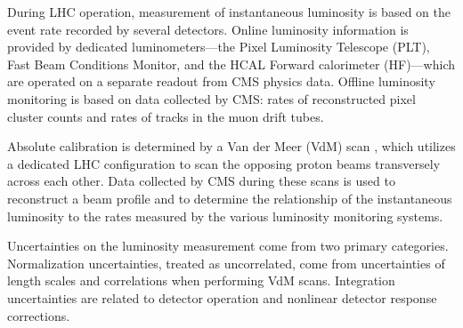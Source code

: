During LHC operation, measurement of  instantaneous luminosity is based on the event rate recorded by several detectors. Online luminosity information is provided by dedicated luminometers---the Pixel Luminosity Telescope (PLT), Fast Beam Conditions Monitor, and the HCAL Forward calorimeter (HF)---which are operated on a separate readout from CMS physics data. Offline luminosity monitoring is based on data collected by CMS: rates of reconstructed pixel cluster counts and rates of tracks in the muon drift tubes\cite{Lujan:2647819}.

Absolute calibration is determined by a Van der Meer (VdM) scan \cite{vanderMeer:1968zz}\cite{Balagura:2011yw}, which utilizes a dedicated LHC configuration to scan the opposing proton beams transversely across each other. Data collected by CMS during these scans is used to reconstruct a beam profile and to determine the relationship of the instantaneous luminosity to the rates measured by the various luminosity monitoring systems.

Uncertainties on the luminosity measurement come from two primary categories. Normalization uncertainties, treated as uncorrelated, come from uncertainties of length scales and correlations when performing VdM scans. Integration uncertainties are related to detector operation and nonlinear detector response corrections\cite{CMS:2018elu}.